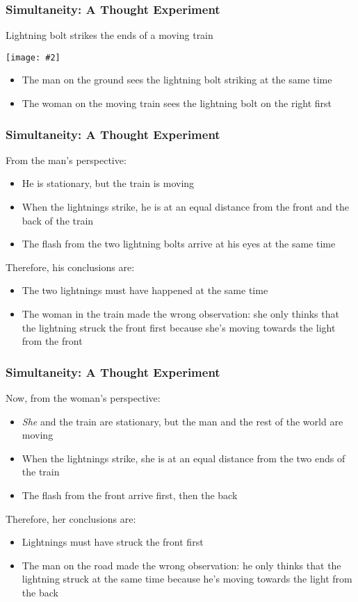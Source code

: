 \documentclass[12pt,compress,aspectratio=169]{beamer}
\newcommand{\pic}[2]{\texttt{[image: \#2]}}
\begin{document}
\begin{frame}
  \frametitle{Simultaneity: A Thought Experiment}
  Lightning bolt strikes the ends of a moving train
  \begin{center}
    \pic{.5}{graphics/87-1-1024x673.png}
  \end{center}
  \vspace{-0.1in}
  \begin{itemize}
  \item The man on the ground sees the lightning bolt striking at the same time
  \item The woman on the moving train sees the lightning bolt on the right first
  \end{itemize}
\end{frame}

\begin{frame}
  \frametitle{Simultaneity: A Thought Experiment}
  From the man's perspective:
  \begin{itemize}
  \item He is stationary, but the train is moving
  \item When the lightnings strike, he is at an equal distance from the front
    and the back of the train
  \item The flash from the two lightning bolts arrive at his eyes at the same
    time
  \end{itemize}
  Therefore, his conclusions are:
  \begin{itemize}
  \item The two lightnings must have happened at the same time
  \item The woman in the train made the wrong observation: she only thinks that
    the lightning struck the front first because she's moving towards the light
    from the front
  \end{itemize}
\end{frame}


\begin{frame}
  \frametitle{Simultaneity: A Thought Experiment}
  Now, from the woman's perspective:
  \begin{itemize}
  \item\emph{She} and the train are stationary, but the man and the rest of the
    world are moving
  \item When the lightnings strike, she is at an equal distance from the two
    ends of the train
  \item The flash from the front arrive first, then the back
  \end{itemize}
  Therefore, her conclusions are:
  \begin{itemize}
  \item Lightnings must have struck the front first
  \item The man on the road made the wrong observation: he only thinks that
    the lightning struck at the same time because he's moving towards the light
    from the back
  \end{itemize}
\end{frame}
\end{document}
